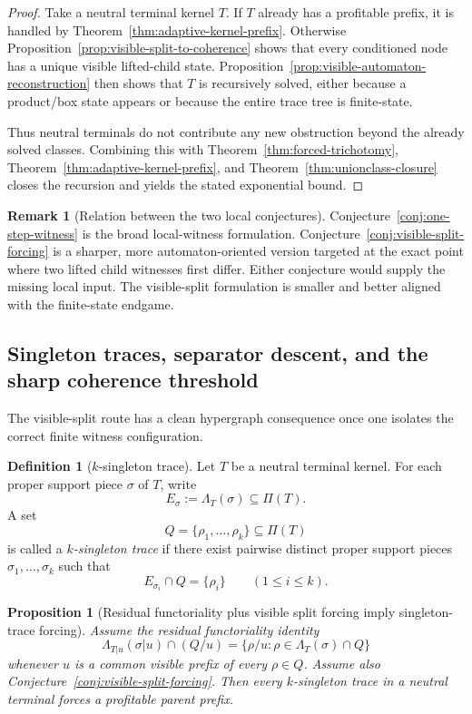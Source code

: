 \documentclass[11pt]{article}
\newtheorem{proposition}[theorem]{Proposition}
\theoremstyle{definition}
\newtheorem{definition}[theorem]{Definition}
\newtheorem{remark}[theorem]{Remark}
\newcommand{\1}{\mathbf{1}}
\begin{document}
\begin{proof}
Take a neutral terminal kernel $T$.
If $T$ already has a profitable prefix, it is handled by Theorem~\ref{thm:adaptive-kernel-prefix}.
Otherwise Proposition~\ref{prop:visible-split-to-coherence} shows that every conditioned node has a unique visible lifted-child state.
Proposition~\ref{prop:visible-automaton-reconstruction} then shows that $T$ is recursively solved, either because a product/box state appears or because the entire trace tree is finite-state.

Thus neutral terminals do not contribute any new obstruction beyond the already solved classes.
Combining this with Theorem~\ref{thm:forced-trichotomy}, Theorem~\ref{thm:adaptive-kernel-prefix}, and Theorem~\ref{thm:unionclass-closure} closes the recursion and yields the stated exponential bound.
\end{proof}

\begin{remark}[Relation between the two local conjectures]\label{rem:witness-vsf}
Conjecture~\ref{conj:one-step-witness} is the broad local-witness formulation.
Conjecture~\ref{conj:visible-split-forcing} is a sharper, more automaton-oriented version targeted at the exact point where two lifted child witnesses first differ.
Either conjecture would supply the missing local input.
The visible-split formulation is smaller and better aligned with the finite-state endgame.
\end{remark}

\subsection*{Singleton traces, separator descent, and the sharp coherence threshold}
The visible-split route has a clean hypergraph consequence once one isolates the correct finite witness configuration.

\begin{definition}[$k$-singleton trace]\label{def:k-singleton-trace}
Let $T$ be a neutral terminal kernel.
For each proper support piece $\sigma$ of $T$, write
\[
E_\sigma:=\Lambda_T(\sigma)\subseteq \Pi(T).
\]
A set
\[
Q=\{\rho_1,\dots,\rho_k\}\subseteq \Pi(T)
\]
is called a \emph{$k$-singleton trace} if there exist pairwise distinct proper support pieces $\sigma_1,\dots,\sigma_k$ such that
\[
E_{\sigma_i}\cap Q=\{\rho_i\}
\qquad (1\le i\le k).
\]
\end{definition}

\begin{proposition}[Residual functoriality plus visible split forcing imply singleton-trace forcing]\label{prop:vsf-to-singleton}
Assume the residual functoriality identity
\[
\Lambda_{T|u}(\sigma|u)\cap (Q/u)
=
\{\rho/u:\rho\in \Lambda_T(\sigma)\cap Q\}
\]
whenever $u$ is a common visible prefix of every $\rho\in Q$.
Assume also Conjecture~\ref{conj:visible-split-forcing}.
Then every $k$-singleton trace in a neutral terminal forces a profitable parent prefix.
\end{proposition}
\end{document}

